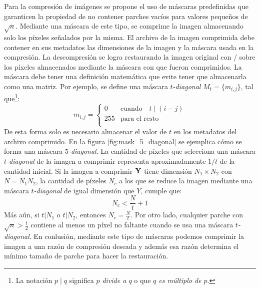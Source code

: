 Para la compresi\'on de im\'agenes se propone el uso de m\'ascaras predefinidas que garanticen la propiedad de no contener parches vac\'ios para valores pequeños de $\sqrt{n}$. Mediante una m\'ascara de este tipo, se comprime la imagen almacenando solo los p\'ixeles señalados por la misma. El archivo de la imagen comprimida debe contener en sus metadatos las dimensiones de la imagen y la m\'ascara usada en la compresi\'on. La descompresi\'on se logra restaurando la imagen original con \SOP/ sobre los p\'ixeles almacenados mediante la m\'ascara con que fueron comprimidos. La m\'ascara debe tener una definici\'on matem\'atica que evite tener que almacenarla como una matriz. Por ejemplo, se define una m\'ascara $t$\textit{-diagonal} $M_t = \{m_{i,j}\}$, tal que\footnote{La notaci\'on $p \mid q$ significa \textit{$p$ divide a $q$} o que \textit{$q$ es m\'ultiplo de $p$}.}:
\begin{equation}
	m_{i, j} = \left\{\begin{array}{rl}
		0 & \mbox{cuando} \quad t \mid (i - j)\\
		255 & \mbox{para el resto} \\
	\end{array}\right.
\end{equation}
De esta forma solo es necesario almacenar el valor de $t$ en los metadatos del archivo comprimido. En la figura \ref{fig:mask_5_diagonal} se ejemplica c\'omo se forma una m\'ascara $5$\textit{-diagonal}. La cantidad de p\'ixeles que selecciona una m\'ascara $t$\textit{-diagonal} de la imagen a comprimir representa aproximadamente $1/t$ de la cantidad inicial. Si la imagen a comprimir $\mathbf{Y}$ tiene dimensi\'on $N_1 \times N_2$ con $N = N_1N_2$, la cantidad de p\'ixeles $N_c$ a los que se reduce la imagen mediante una m\'ascara $t$\textit{-diagonal} de igual dimensi\'on que $Y$, cumple que:
\begin{equation}
	N_c < \frac{N}{t} + 1
\end{equation}
M\'as a\'un, si $t | N_1$ o $t | N_2$, entonces $N_c = \frac{N}{t}$. Por otro lado, cualquier parche con $\sqrt{n} > \frac{t}{2}$ contiene al menos un p\'ixel no faltante cuando se usa una m\'ascara $t$\textit{-diagonal}. En conlusi\'on, mediante este tipo de m\'ascaras podemos comprimir la imagen a una raz\'on de compresi\'on deseada y adem\'as esa raz\'on determina el m\'inimo tamaño de parche para hacer la restauraci\'on.
